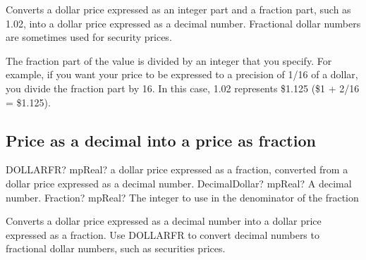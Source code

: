 \vspace{0.3cm}
Converts a dollar price expressed as an integer part and a fraction part, such as 1.02, into a dollar price expressed as a decimal number. Fractional dollar numbers are sometimes used for security prices.

The fraction part of the value is divided by an integer that you specify. For example, if you want your price to be expressed to a precision of 1/16 of a dollar, you divide the fraction part by 16. In this case, 1.02 represents \$1.125 (\$1 + 2/16 = \$1.125).




\subsection{Price as a decimal into a price as fraction}

\begin{mpFunctionsExtract}
	\mpWorksheetFunctionTwoNotImplemented
	{DOLLARFR? mpReal?  a dollar price expressed as a fraction, converted from a dollar price expressed as a decimal number.}
	{DecimalDollar? mpReal? A decimal number.}
	{Fraction? mpReal? The integer to use in the denominator of the fraction}
\end{mpFunctionsExtract}

\vspace{0.3cm}
Converts a dollar price expressed as a decimal number into a dollar price expressed as a fraction. Use DOLLARFR to convert decimal numbers to fractional dollar numbers, such as securities prices.


